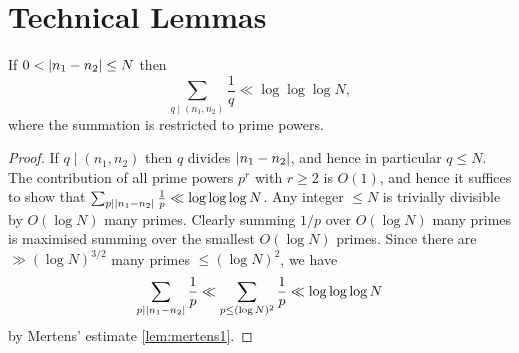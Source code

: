 \chapter{Technical Lemmas}
\label{chap:techlemmas}


\begin{lemma}
  \label{lem:basic}
  \leanok
  If $0<\left\lvert n_1-n_2\right\rvert\leq N$ then
  \[\sum_{q\mid (n_1,n_2)}\frac{1}{q}\ll \log\log\log N,\]
  where the summation is restricted to prime powers.
\end{lemma}
\begin{proof}
  \leanok
  If $q\mid (n_1,n_2)$ then $q$ divides $\left\lvert n_1-n_2\right\rvert$, and hence in particular $q\leq N$. The contribution of all prime powers $p^r$ with $r\geq 2$ is $O(1)$, and hence it suffices to show that $\sum_{p\mid \left\lvert n_1-n_2\right\rvert}\frac{1}{p}\ll \log\log\log N$. Any integer $\leq N$ is trivially divisible by $O(\log N)$ many primes. Clearly summing $1/p$ over $O(\log N)$ many primes is maximised summing over the smallest $O(\log N)$ primes. Since there are $\gg (\log N)^{3/2}$ many primes $\leq (\log N)^2$, we have
  \[\sum_{p\mid \left\lvert n_1-n_2\right\rvert}\frac{1}{p}\ll \sum_{p\leq (\log N)^2}\frac{1}{p}\ll \log\log\log N\]
  by Mertens' estimate \ref{lem:mertens1}.
\end{proof}

